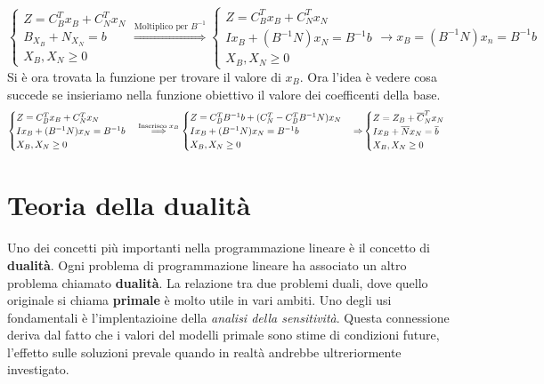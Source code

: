 \documentclass{article}
\begin{document}
$$
  \begin{cases}
    Z=C_B^Tx_B+C^T_Nx_N \\
    B_{X_B}+N_{X_N}=b   \\
    X_B, X_N \ge 0
  \end{cases}
  \overset{\text{Moltiplico per } B^{-1}}{\Longrightarrow}
  \begin{cases}
    Z=C_B^Tx_B+C^T_Nx_N       \\
    Ix_B+(B^{-1}N)x_N=B^{-1}b \\
    X_B, X_N \ge 0
  \end{cases}
  \to x_B= (B^{-1}N)x_n=B^{-1}b
$$
Si è ora trovata la funzione per trovare il valore di $x_B$. Ora l'idea è vedere cosa succede se insieriamo nella funzione obiettivo il valore dei coefficenti della base.
$$
  \begin{cases}
    Z=C_B^Tx_B+C^T_Nx_N       \\
    Ix_B+(B^{-1}N)x_N=B^{-1}b \\
    X_B, X_N \ge 0
  \end{cases}
  \overset{\text{Inserisco }x_B}{\Longrightarrow}
  \begin{cases}
    Z=C_B^TB^{-1}b+(C^T_N-C^T_BB^{-1}N)x_N \\
    Ix_B+(B^{-1}N)x_N=B^{-1}b              \\
    X_B, X_N \ge 0
  \end{cases} \\
  {\Rightarrow}
  \begin{cases}
    Z=Z_B+\overline{C}^T_Nx_N         \\
    Ix_B+\overline{N}x_N=\overline{b} \\
    X_B, X_N \ge 0
  \end{cases}
$$

\section{Teoria della dualità}
Uno dei concetti più importanti nella programmazione lineare è il concetto di \textbf{dualità}. Ogni problema di programmazione lineare ha associato un altro problema chiamato \textbf{dualità}. La relazione tra due problemi duali, dove quello originale si chiama \textbf{primale} è molto utile in vari ambiti. Uno degli usi fondamentali è l'implentazioine della \textit{analisi della sensitività}. Questa connessione deriva dal fatto che i valori del modelli primale sono stime di condizioni future, l'effetto sulle soluzioni prevale quando in realtà andrebbe ultreriormente investigato.
\end{document}
